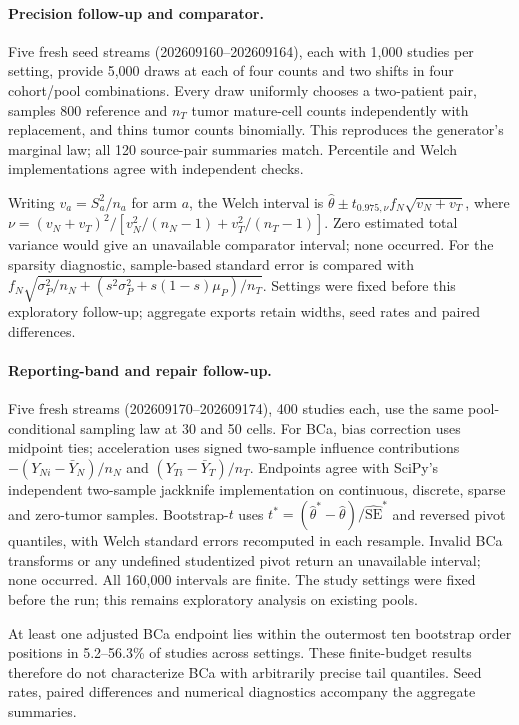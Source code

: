 \appendix


\paragraph{Precision follow-up and comparator.}\label{app:precision}
Five fresh seed streams (202609160--202609164), each with 1{,}000 studies
per setting, provide 5{,}000 draws at each of four counts and two shifts in
four cohort/pool combinations. Every draw uniformly chooses a two-patient
pair, samples 800 reference and $n_T$ tumor mature-cell counts independently
with replacement, and thins tumor counts binomially. This reproduces the generator's marginal law;
all 120 source-pair summaries match. Percentile and Welch implementations
agree with independent checks.

Writing $v_a=S_a^2/n_a$ for arm $a$, the Welch interval is
$\hat\theta\pm t_{0.975,\nu} f_N\sqrt{v_N+v_T}$, where
$\nu=(v_N+v_T)^2/[v_N^2/(n_N-1)+v_T^2/(n_T-1)]$.
Zero estimated total variance would give an unavailable comparator interval;
none occurred. For the sparsity diagnostic, sample-based standard error is
compared with $f_N\sqrt{\sigma_P^2/n_N+
(s^2\sigma_P^2+s(1-s)\mu_P)/n_T}$. Settings were fixed before this exploratory follow-up; aggregate exports retain
widths, seed rates and paired differences.

\paragraph{Reporting-band and repair follow-up.}\label{app:repair}
Five fresh streams (202609170--202609174), 400 studies each, use the same
pool-conditional sampling law at 30 and 50 cells. For BCa, bias correction uses midpoint ties;
acceleration uses signed two-sample influence contributions
$-(Y_{Ni}-\bar Y_N)/n_N$ and $(Y_{Ti}-\bar Y_T)/n_T$.
Endpoints agree with SciPy's independent two-sample jackknife implementation
on continuous, discrete, sparse and zero-tumor samples. Bootstrap-$t$ uses
$t^*=(\hat\theta^*-\hat\theta)/\widehat{\mathrm{SE}}^*$ and reversed pivot
quantiles, with Welch standard errors recomputed in each resample. Invalid
BCa transforms or any undefined studentized pivot return an unavailable
interval; none occurred. All 160{,}000 intervals are finite. The study settings
were fixed before the run; this remains exploratory analysis on existing pools.

At least one adjusted BCa endpoint lies within the outermost ten bootstrap
order positions in 5.2--56.3\% of studies across settings. These finite-budget
results therefore do not characterize BCa with arbitrarily precise tail
quantiles. Seed rates, paired differences and numerical diagnostics accompany
the aggregate summaries.

